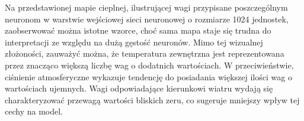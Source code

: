 \documentclass[a4paper,twoside,12pt]{book}
\begin{document}
Na przedstawionej mapie cieplnej, ilustrującej wagi przypisane poszczególnym neuronom w warstwie wejściowej sieci neuronowej o rozmiarze 1024 jednostek, zaobserwować można istotne wzorce, choć sama mapa staje się trudna do interpretacji ze względu na dużą gęstość neuronów. Mimo tej wizualnej złożoności, zauważyć można, że temperatura zewnętrzna jest reprezentowana przez znacząco większą liczbę wag o dodatnich wartościach. W przeciwieństwie, ciśnienie atmosferyczne wykazuje tendencję do posiadania większej ilości wag o wartościach ujemnych. Wagi odpowiadające kierunkowi wiatru wydają się charakteryzować przewagą wartości bliskich zeru, co sugeruje mniejszy wpływ tej cechy na model.

\begin{table}[!h]
  \centering
  \caption{Porównianie wag wejściowych dla pierwszej warstwy rozbudowanego modelu}
\end{table}
\end{document}
